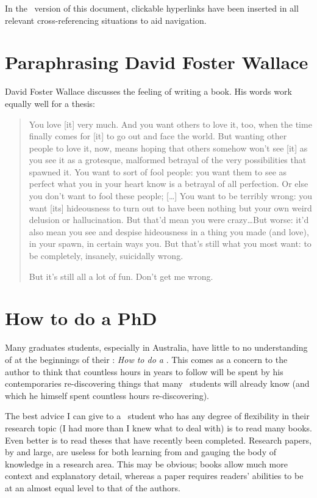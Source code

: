 In the \PDF\ version of this document, clickable hyperlinks have been inserted
in all relevant cross-referencing situations to aid navigation.




\section{Paraphrasing David Foster Wallace}

David Foster Wallace discusses the feeling of writing a book.
His words work equally well for a thesis:

\begin{quotation}
You love [it] very much. And you want others to love it, too, when the time
finally comes for [it] to go out and face the world. But wanting other people
to love it, now, means hoping that others somehow won't see [it] as you see it
\dash as a grotesque, malformed betrayal of the very possibilities that
spawned it. You want to sort of fool people: you want them to see as perfect
what you in your heart know is a betrayal of all perfection. Or else you don't
want to fool these people; [\dots] You want to be terribly wrong: you want [its]
hideousness to turn out to have been nothing but your own weird delusion or
hallucination. But that'd mean you were crazy\dots But worse: it'd also mean
you see and despise hideousness in a thing you made (and love), in your spawn,
in certain ways you. But that's still what you most want: to be completely,
insanely, suicidally wrong.

But it's still all a lot of fun. Don't get me wrong.
\end{quotation}

\section{How to do a PhD}

Many graduates students, especially in Australia, have little to no
understanding of at the beginnings of their \PhD: \emph{How to do a
  \PhD}. This comes as a concern to the author to think that countless
hours in years to follow will be spent by his contemporaries
re-discovering things that many \PhD\ students will already know (and
which he himself spent countless hours re-discovering).

The best advice I can give to a \PhD\ student who has any degree of
flexibility in their research topic (I had more than I knew what to
deal with) is to read many books. Even better is to read theses that
have recently been completed. Research papers, by and large, are
useless for both learning from and gauging the body of knowledge in a
research area. This may be obvious; books allow much more context and
explanatory detail, whereas a paper requires readers' abilities to be
at an almost equal level to that of the authors.
